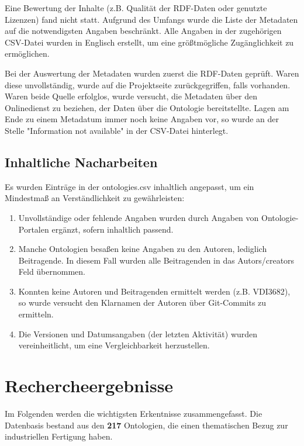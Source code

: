 \documentclass{article}
\begin{document}
Eine Bewertung der Inhalte (z.B. Qualität der RDF-Daten oder genutzte Lizenzen) fand nicht statt.
Aufgrund des Umfangs wurde die Liste der Metadaten auf die notwendigsten Angaben beschränkt.
Alle Angaben in der zugehörigen CSV-Datei wurden in Englisch erstellt, um eine größtmögliche Zugänglichkeit zu ermöglichen.

Bei der Auswertung der Metadaten wurden zuerst die RDF-Daten geprüft. Waren diese unvollständig, wurde auf die Projektseite zurückgegriffen, falls vorhanden.
Waren beide Quelle erfolglos, wurde versucht, die Metadaten über den Onlinedienst zu beziehen, der Daten über die Ontologie bereitstellte.
Lagen am Ende zu einem Metadatum immer noch keine Angaben vor, so wurde an der Stelle "Information not available" in der CSV-Datei hinterlegt.

\subsection{Inhaltliche Nacharbeiten}

Es wurden Einträge in der ontologies.csv inhaltlich angepasst, um ein Mindestmaß an Verständlichkeit zu gewährleisten:

\begin{enumerate}
    \item Unvollständige oder fehlende Angaben wurden durch Angaben von Ontologie-Portalen ergänzt, sofern inhaltlich passend.
    \item Manche Ontologien besaßen keine Angaben zu den Autoren, lediglich Beitragende. In diesem Fall wurden alle Beitragenden in das Autors/creators Feld übernommen.
    \item Konnten keine Autoren und Beitragenden ermittelt werden (z.B. VDI3682), so wurde versucht den Klarnamen der Autoren über Git-Commits zu ermitteln.
    \item Die Versionen und Datumsangaben (der letzten Aktivität) wurden vereinheitlicht, um eine Vergleichbarkeit herzustellen.
\end{enumerate}

\section{Rechercheergebnisse}

Im Folgenden werden die wichtigsten Erkentnisse zusammengefasst.
Die Datenbasis bestand aus den \textbf{217} Ontologien, die einen thematischen Bezug zur industriellen Fertigung haben.
\end{document}
